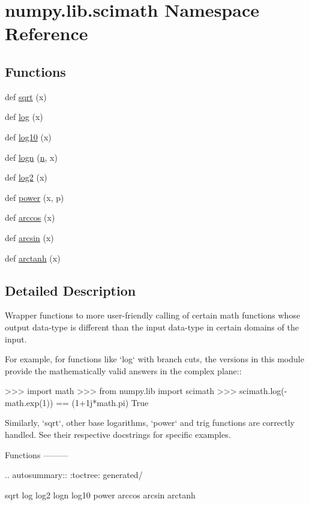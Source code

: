 \hypertarget{namespacenumpy_1_1lib_1_1scimath}{}\section{numpy.\+lib.\+scimath Namespace Reference}
\label{namespacenumpy_1_1lib_1_1scimath}
\subsection*{Functions}
\begin{DoxyCompactItemize}
\item 
def \hyperlink{namespacenumpy_1_1lib_1_1scimath_a62a6a855729e4cb6bcf2fa28b65f0b17}{sqrt} (x)
\item 
def \hyperlink{namespacenumpy_1_1lib_1_1scimath_a7219fe7d43e8f38dc344562ec9586219}{log} (x)
\item 
def \hyperlink{namespacenumpy_1_1lib_1_1scimath_a8eb4fdbb200982738232bd19e56fce16}{log10} (x)
\item 
def \hyperlink{namespacenumpy_1_1lib_1_1scimath_ada5a76e9576694ac6135decd9456937b}{logn} (\hyperlink{namespacenumpy_a352663c52853d2754274407d5cae2832}{n}, x)
\item 
def \hyperlink{namespacenumpy_1_1lib_1_1scimath_a7ad3798370da0c475531cd6fa59a64f1}{log2} (x)
\item 
def \hyperlink{namespacenumpy_1_1lib_1_1scimath_add4d264003a9655b6720b3e5aaca7caf}{power} (x, p)
\item 
def \hyperlink{namespacenumpy_1_1lib_1_1scimath_a86d091c95419b41624c14bba0f8f984a}{arccos} (x)
\item 
def \hyperlink{namespacenumpy_1_1lib_1_1scimath_a056e2ee08f73ea14121699d1d53ce962}{arcsin} (x)
\item 
def \hyperlink{namespacenumpy_1_1lib_1_1scimath_aebdc2055e5745021f61f1827e86a26ef}{arctanh} (x)
\end{DoxyCompactItemize}


\subsection{Detailed Description}
\begin{DoxyVerb}Wrapper functions to more user-friendly calling of certain math functions
whose output data-type is different than the input data-type in certain
domains of the input.

For example, for functions like `log` with branch cuts, the versions in this
module provide the mathematically valid answers in the complex plane::

  >>> import math
  >>> from numpy.lib import scimath
  >>> scimath.log(-math.exp(1)) == (1+1j*math.pi)
  True

Similarly, `sqrt`, other base logarithms, `power` and trig functions are
correctly handled.  See their respective docstrings for specific examples.

Functions
---------

.. autosummary::
   :toctree: generated/

   sqrt
   log
   log2
   logn
   log10
   power
   arccos
   arcsin
   arctanh\end{DoxyVerb}
 

